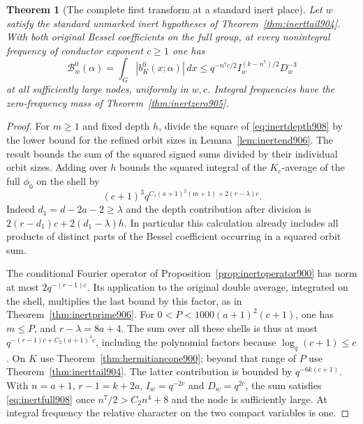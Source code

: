 \documentclass[a4paper,11pt]{article}
\newtheorem{theorem}[proposition]{Theorem}
\theoremstyle{definition}
\theoremstyle{remark}
\numberwithin{equation}{section}
\begin{document}
\begin{theorem}[The complete first transform at a standard inert place]
\leavevmode\label{thm:inertfull908}
Let \(w\) satisfy the standard unmarked inert hypotheses of
Theorem~\ref{thm:inerttail904}. With both original Bessel
coefficients on the full group, at every nonintegral frequency
of conductor exponent \(c\ge1\) one has
\begin{equation}
       \mathcal B^0_w(\alpha)=\int_G|b^0_K(x;\alpha)|\,dx
          \le q^{-n^7c/2} I_w^{(k-n^7)/2}D_w^{-3}
 \label{eq:inertfull908}
\end{equation}
at all sufficiently large nodes, uniformly in \(w,c\).
Integral frequencies have the zero-frequency mass of
Theorem~\ref{thm:inertzero905}.
\end{theorem}
\begin{proof}
For \(m\ge1\) and fixed depth \(h\), divide the square of
\eqref{eq:inertdepth908} by the lower bound for the refined
orbit sizes in Lemma~\ref{lem:inertend906}. The result bounds
the sum of the squared signed sums divided by their individual
orbit sizes. Adding over \(h\) bounds the squared integral of
the \(K_c\)-average of the full \(\phi_0\) on the shell by
\[
       (c+1)^3 q^{C_1(a+1)^2(m+1)+2(r-\lambda)c}.
\]
Indeed \(d_1=d-2a-2\ge\lambda\) and the depth contribution
after division is \(2(r-d_1)c+2(d_1-\lambda)h\).
In particular this calculation already includes all products
of distinct parts of the Bessel coefficient occurring in a
squared orbit sum.

The conditional Fourier operator of
Proposition~\ref{prop:inertoperator900} has norm at most
\(2q^{-(r-1)c}\). Its application to the original double
average, integrated on the shell, multiplies the last bound
by this factor, as in Theorem~\ref{thm:inertprime906}.
For \(0<P<1000(a+1)^2(c+1)\), one has \(m\le P\), and
\(r-\lambda=8a+4\). The sum over all these shells is thus
at most \(q^{-(r-1)c+C_2(a+1)^4c}\), including the polynomial
factors because \(\log_q(c+1)\le c\). On \(K\) use
Theorem~\ref{thm:hermitiancone900}; beyond that range of
\(P\) use Theorem~\ref{thm:inerttail904}. The latter contribution
is bounded by \(q^{-6k(c+1)}\). With \(n=a+1\), \(r-1=k+2a\),
\(I_w=q^{-2c}\) and \(D_w=q^{2c}\), the sum satisfies
\eqref{eq:inertfull908} once \(n^7/2>C_2 n^4+8\) and the
node is sufficiently large. At integral frequency the relative
character on the two compact variables is one.
\end{proof}
\end{document}
